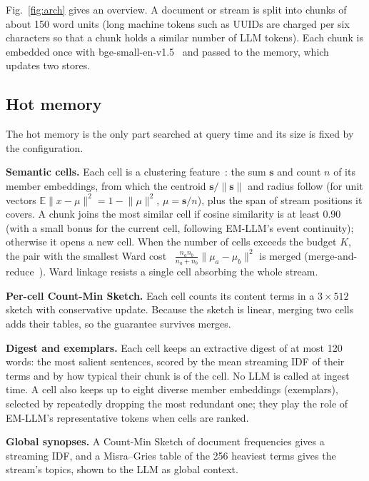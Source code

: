 \documentclass[conference,10pt]{IEEEtran}
\begin{document}
Fig.~\ref{fig:arch} gives an overview. A document or stream is split into chunks of about 150 word units (long machine
tokens such as UUIDs are charged per six characters so that a chunk holds a similar number of LLM tokens). Each chunk
is embedded once with bge-small-en-v1.5~\cite{xiao2023cpack} and passed to the memory, which updates two stores.

\subsection{Hot memory}
The hot memory is the only part searched at query time and its size is fixed by the configuration.

\textbf{Semantic cells.} Each cell is a clustering feature~\cite{zhang1996birch}: the sum $\mathbf{s}$ and count $n$ of its
member embeddings, from which the centroid $\mathbf{s}/\lVert\mathbf{s}\rVert$ and radius follow (for unit vectors
$\mathbb{E}\lVert x-\mu\rVert^2 = 1-\lVert\mu\rVert^2$, $\mu=\mathbf{s}/n$), plus the span of stream positions it covers.
A chunk joins the most similar cell if cosine similarity is at least 0.90 (with a small bonus for the current cell,
following EM-LLM's event continuity); otherwise it opens a new cell. When the number of cells exceeds the budget $K$,
the pair with the smallest Ward cost~\cite{ward1963hierarchical} $\frac{n_a n_b}{n_a+n_b}\lVert\mu_a-\mu_b\rVert^2$ is
merged (merge-and-reduce~\cite{guha2003clustering}). Ward linkage resists a single cell absorbing the whole stream.

\textbf{Per-cell Count-Min Sketch.} Each cell counts its content terms in a $3\times512$ sketch with conservative update.
Because the sketch is linear, merging two cells adds their tables, so the guarantee survives merges.

\textbf{Digest and exemplars.} Each cell keeps an extractive digest of at most 120 words: the most salient sentences,
scored by the mean streaming IDF of their terms and by how typical their chunk is of the cell. No LLM is called at
ingest time. A cell also keeps up to eight diverse member embeddings (exemplars), selected by repeatedly dropping the
most redundant one; they play the role of EM-LLM's representative tokens when cells are ranked.

\textbf{Global synopses.} A Count-Min Sketch of document frequencies gives a streaming IDF, and a Misra--Gries table of
the 256 heaviest terms gives the stream's topics, shown to the LLM as global context.
\end{document}
